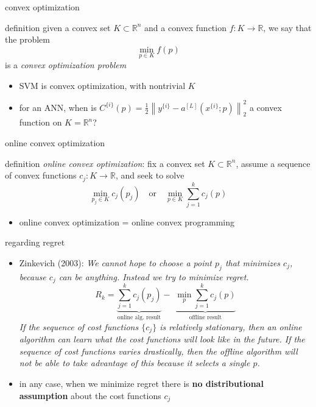 \documentclass[xcolor={svgnames},
               hyperref={colorlinks,citecolor=DeepPink4,linkcolor=FireBrick,urlcolor=Maroon}]
               {beamer}
\newcommand{\RR}{\mathbb{R}}
\begin{document}
\begin{frame}{convex optimization}

\begin{block}{definition}
given a convex set $K \subset \RR^n$ and a convex function $f:K\to \RR$, we say that the problem
    $$\min_{p \in K} f(p)$$
is a \emph{convex optimization problem}
\end{block}

\begin{itemize}
\item SVM is convex optimization, with nontrivial $K$
\item for an ANN, when is $C^{\{i\}}(p) = \frac{1}{2} \left\|y^{\{i\}} - a^{[L]}(x^{\{i\}}; p)\right\|_2^2$ a convex function on $K = \RR^n$?
\end{itemize}
\end{frame}


\begin{frame}{online convex optimization}

\begin{block}{definition}
\emph{online convex optimization}:  fix a convex set $K\subset \RR^n$, assume a sequence of convex functions $c_j:K\to \RR$, and seek to solve
    $$\min_{p_j \in K} c_j(p_j) \quad \text{or} \quad \min_{p \in K} \sum_{j=1}^k c_j(p)$$
\end{block}

\begin{itemize}
\item online convex optimization = online convex programming
\end{itemize}
\end{frame}


\begin{frame}{regarding regret}

\begin{itemize}
\item Zinkevich (2003): \emph{We cannot hope to choose a point $p_j$ that minimizes $c_j$, because $c_j$ can be anything. Instead we try to minimize regret.}
  $$R_k = \underbrace{\sum_{j=1}^k c_j(p_j)}_{\text{online alg.~result}} - \,\, \underbrace{\min_p \sum_{j=1}^k c_j(p)}_{\text{offline result}}$$
\noindent \emph{If the sequence of cost functions $\{c_j\}$ is relatively stationary, then an online algorithm can learn what the cost functions will look like in the future.  If the sequence of cost functions varies drastically, then the offline algorithm will not be able to take advantage of this because it selects a single $p$.}

\item in any case, when we minimize regret there is \textbf{no distributional assumption} about the cost functions $c_j$
\end{itemize}
\end{frame}
\end{document}
